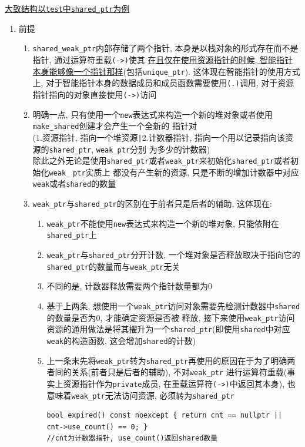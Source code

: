 \uline{大致结构以{\tt test}中{\tt shared\_ptr}为例}
\begin{enumerate}
	\item 前提
	\begin{enumerate}
		\item {\tt shared\_weak\_ptr}内部存储了两个指针, 本身是以栈对象的形式存在而不是指针, 通过运算符重载{\tt(->)}使其
				\uline{在且仅在使用资源指针的时候, 智能指针本身能够像一个指针那样}(包括{\tt unique\_ptr}). 这体现在智能指针的使用方式
				上, 对于智能指针本身的数据成员和成员函数需要使用{\tt (.)}调用, 对于资源指针指向的对象直接使用{\tt (->)}访问
		\item 明确一点, 只有使用一个{\tt new}表达式来构造一个新的堆对象或者使用{\tt make\_shared}创建才会产生一个全新的
				指针对\\(1.资源指针, 指向一个堆资源{\tt|}2.计数器指针, 指向一个用以记录指向该资源的{\tt shared\_ptr}, {\tt weak\_ptr}分别
				为多少的计数器)\\除此之外无论是使用{\tt shared\_ptr}或者{\tt weak\_ptr}来初始化{\tt shared\_ptr}或者初始化{\tt weak\_} {\tt ptr}实质上
				都没有产生新的资源, 只是不断的增加计数器中对应{\tt weak}或者{\tt shared}的数量
		\item {\tt weak\_ptr}与{\tt shared\_ptr}的区别在于前者只是后者的辅助, 这体现在:
		\begin{enumerate}
			\item {\tt weak\_ptr}不能使用{\tt new}表达式来构造一个新的堆对象, 只能依附在{\tt shared\_ptr}上
			\item {\tt weak\_ptr}与{\tt shared\_ptr}分开计数, 一个堆对象是否释放取决于指向它的{\tt shared\_ptr}的数量而与{\tt weak\_ptr}无关
			\item 不同的是, 计数器释放需要两个指针数量都为0
			\item 基于上两条, 想使用一个{\tt weak\_ptr}访问对象需要先检测计数器中{\tt shared}的数量是否为0, 才能确定资源是否被
					释放, 接下来使用{\tt weak\_ptr}访问资源的通用做法是将其擢升为一个{\tt shared\_ptr}(即使用{\tt shared}中对应{\tt weak}的构造函数, 
					这会增加{\tt shared}的计数)
			\item 上一条末先将{\tt weak\_ptr}转为{\tt shared\_ptr}再使用的原因在于为了明确两者间的关系(前者只是后者的辅助), 不对{\tt weak\_ptr}
					进行运算符重载(事实上资源指针作为{\tt private}成员, 在重载运算符{\tt (->)}中返回其本身), 也意味着{\tt weak\_ptr}无法访问资源, 
					必须转为{\tt shared\_ptr}
			\begin{lstlisting}
bool expired() const noexcept { return cnt == nullptr || cnt->use_count() == 0; }
//cnt为计数器指针, use_count()返回shared数量

\end{lstlisting}
\end{enumerate}
\end{enumerate}
\end{enumerate}
